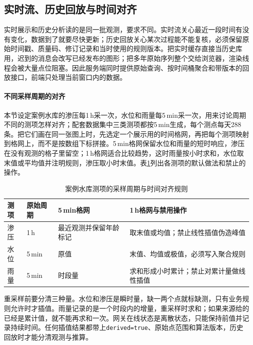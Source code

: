 \subsection{实时流、历史回放与时间对齐}

实时展示和历史分析读的是同一批观测，要求不同。实时流关心最近一段时间有没有变化，数据到了就要尽快更新；历史回放关心某次过程能不能复核，必须保留原始时间戳、质量码、修订记录和当时使用的规则版本。把实时缓存直接当历史库用，迟到的消息会改写已经发布的图形；把多年原始序列整个交给浏览器，渲染线程会被大量点位阻塞。因此服务端同时提供原始查询、按时间桶聚合和带版本的回放接口，前端只处理当前窗口内的数据。

\paragraph{不同采样周期的对齐}本节设定案例水库的渗压每1\,h采一次，水位和雨量每5\,min采一次，用来讨论周期不同的测项怎样对齐；配套数据集中三类测项都按5\,min生成，每个测点每天288条。把它们画在同一张图上时，先选定一个展示用的时间格网，再把每个测项映射到格网上，而不是按数组下标拼接。5\,min格网保留水位和雨量的短时响应，渗压在没有观测的格子里留空；1\,h格网适合比较趋势，这时雨量按小时求和，水位取末值或平均值并注明规则，渗压取小时末值。表\ref{tab:ch7-time-alignment}列出各测项的默认做法和禁止的操作。

\begin{table}[htbp]
\centering
\caption{案例水库测项的采样周期与时间对齐规则}
\label{tab:ch7-time-alignment}
\begin{tabular}{p{2.4cm}p{2.5cm}p{4.2cm}p{3.5cm}}
\toprule
测项 & 原始周期 & 5\,min格网 & 1\,h格网与禁用操作 \\
\midrule
渗压 & 1\,h & 最近观测并保留年龄标记 & 取末值或均值；禁止线性插值伪造峰值 \\
水位 & 5\,min & 原值 & 末值、均值或极值，必须写入聚合规则 \\
雨量 & 5\,min & 时段量 & 求和形成小时累计；禁止对累计量做线性插值 \\
\bottomrule
\end{tabular}
\end{table}

重采样前要分清三种量。水位和渗压是瞬时量，缺一两个点就标缺测，只有业务规则允许时才插值。雨量记录的是一个时段内的增量，重采样时求和；如果来源给的已经是累计值，就不能再求和一次。网关在线状态是离散状态，只能保持前值并记录持续时间。任何插值结果都带上\texttt{derived=true}、原始点范围和算法版本，历史回放时才能分清观测与推算。

